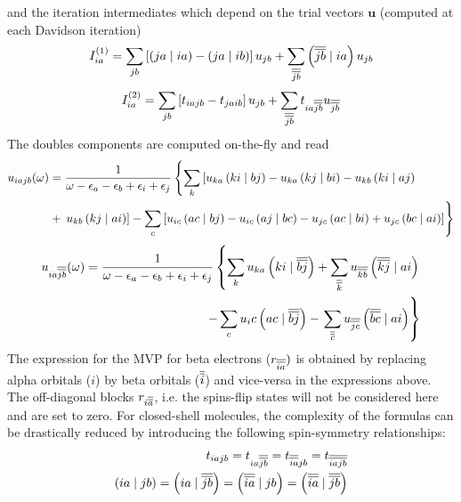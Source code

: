 \noindent and the iteration intermediates which depend on the trial vectors $\mathbf{u}$ (computed at each Davidson iteration)
\begin{equation}
I_{ia}^{(1)} = \sum_{jb} \left[ \left( ja \mid ia \right) - \left( ja \mid ib \right) \right] u_{jb} + \sum_{\overline{\overline{jb}}} \left( \overline{\overline{jb}} \mid ia \right) u_{jb}
\end{equation}
\begin{equation}
I_{ia}^{(2)} = \sum_{jb} \left[ t_{iajb} - t_{jaib} \right] u_{jb} + \sum_{\overline{\overline{jb}}} t_{ia\overline{\overline{jb}}} u_{\overline{\overline{jb}}}
\end{equation}
\noindent The doubles components are computed on-the-fly and read
\begin{equation}
\begin{split}
u_{iajb}(\omega) &= \frac{1}{\omega - \epsilon_a - \epsilon_b + \epsilon_i + \epsilon_j} \left\lbrace \sum_k \left[ u_{ka} \left( ki \mid bj \right) - u_{ka} \left( kj \mid bi \right) - u_{kb} \left( ki \mid aj \right) \right. \right. \\
&+ \left. \left. u_{kb} \left( kj \mid ai \right) \right] - \sum_c \left[ u_{ic} \left( ac \mid bj \right) - u_{ic} \left( aj \mid bc \right) - u_{jc} \left( ac \mid bi \right) + u_{jc} \left( bc \mid ai \right) \right] \right\rbrace
\end{split}
\end{equation}
\begin{equation}
\begin{split}
u_{ia\overline{\overline{jb}}}(\omega) = \frac{1}{\omega - \epsilon_a - \epsilon_b + \epsilon_i + \epsilon_j} \left\lbrace \sum_k u_{ka} \left( ki \mid \overline{\overline{bj}} \right) + \sum_{\overline{\overline{k}}} u_{\overline{\overline{kb}}} \left( \overline{\overline{kj}} \mid ai \right) \right. \\ - \sum_c u_ic \left( ac \mid \overline{\overline{bj}} \right) - \left. \sum_{\overline{\overline{c}}} u_{\overline{\overline{jc}}} \left( \overline{\overline{bc}} \mid ai \right) \right\rbrace
\end{split}
\end{equation}
\noindent The expression for the MVP for beta electrons ($r_{\overline{\overline{ia}}})$ is obtained by replacing alpha orbitals ($i$) by beta orbitals ($\overline{\overline{i}}$) and vice-versa in the expressions above. The off-diagonal blocks $r_{i\overline{\overline{a}}}$, i.e. the spins-flip states will not be considered here and are set to zero. For closed-shell molecules, the complexity of the formulas can be drastically reduced by introducing the following spin-symmetry relationships:
\begin{equation}
\begin{split}
t_{iajb} = t_{ia\overline{\overline{jb}}} = t_{\overline{\overline{ia}}jb} = t_{\overline{\overline{iajb}}} \\
\left( ia \mid jb \right) = \left( ia \mid \overline{\overline{jb}} \right) = \left( \overline{\overline{ia}} \mid jb \right) = \left( \overline{\overline{ia}} \mid \overline{\overline{jb}} \right) 
\end{split}
\end{equation}
